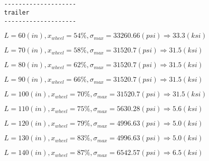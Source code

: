 \documentclass[11pt]{article}
\newcommand{\prompt}[4]{
        {\ttfamily\llap{{\color{#2}[#3]:\hspace{3pt}#4}}\vspace{-\baselineskip}}
    }
\begin{document}
    \begin{Verbatim}[commandchars=\\\{\}]


--------------------
trailer
--------------------

    \end{Verbatim}
 
            
\prompt{Out}{outcolor}{12}{}
    
    $L= 60(in), x_{wheel}=54 \%, \sigma_{max}=33260.66(psi) \Rightarrow 33.3(ksi)$

    
 
            
\prompt{Out}{outcolor}{12}{}
    
    $L= 70(in), x_{wheel}=58 \%, \sigma_{max}=31520.7(psi) \Rightarrow 31.5(ksi)$

    
 
            
\prompt{Out}{outcolor}{12}{}
    
    $L= 80(in), x_{wheel}=62 \%, \sigma_{max}=31520.7(psi) \Rightarrow 31.5(ksi)$

    
 
            
\prompt{Out}{outcolor}{12}{}
    
    $L= 90(in), x_{wheel}=66 \%, \sigma_{max}=31520.7(psi) \Rightarrow 31.5(ksi)$

    
 
            
\prompt{Out}{outcolor}{12}{}
    
    $L= 100(in), x_{wheel}=70 \%, \sigma_{max}=31520.7(psi) \Rightarrow 31.5(ksi)$

    
 
            
\prompt{Out}{outcolor}{12}{}
    
    $L= 110(in), x_{wheel}=75 \%, \sigma_{max}=5630.28(psi) \Rightarrow 5.6(ksi)$

    
 
            
\prompt{Out}{outcolor}{12}{}
    
    $L= 120(in), x_{wheel}=79 \%, \sigma_{max}=4996.63(psi) \Rightarrow 5.0(ksi)$

    
 
            
\prompt{Out}{outcolor}{12}{}
    
    $L= 130(in), x_{wheel}=83 \%, \sigma_{max}=4996.63(psi) \Rightarrow 5.0(ksi)$

    
 
            
\prompt{Out}{outcolor}{12}{}
    
    $L= 140(in), x_{wheel}=87 \%, \sigma_{max}=6542.57(psi) \Rightarrow 6.5(ksi)$
\end{document}
